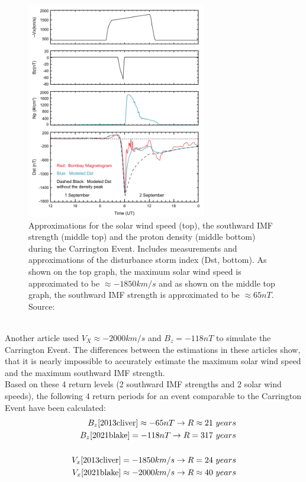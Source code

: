 \documentclass[12pt]{article}
\begin{document}
        \begin{figure}[t!]
            \centering
            \includegraphics[width=0.7\textwidth]{fig_discussion/carrington.png}
            \caption{Approximations for the solar wind speed (top), the southward IMF strength (middle top) and the proton density (middle bottom) during the Carrington Event. Includes measurements and approximations of the disturbance storm index (Dst, bottom). As shown on the top graph, the maximum solar wind speed is approximated to be $\approx -1850 km/s$ and as shown on the middle top graph, the southward IMF strength is approximated to be $\approx 65nT$. Source: \cite{2006xinlin}}
            \label{fig:returncarrington}
        \end{figure}\\
        Another article\cite{2021blake} used $V_X\approx -2000km/s$ and $B_z=-118nT$ to simulate the Carrington Event. The differences between the estimations in these articles show, that it is nearly impossible to accurately estimate the maximum solar wind speed and the maximum southward IMF strength.\\
        Based on these 4 return levels (2 southward IMF strengths and 2 solar wind speeds), the following 4 return periods for an event comparable to the Carrington Event have been calculated:
        \begin{equation}
            \begin{split}
                B_z\cite{2013cliver}\approx -65nT\rightarrow R\approx 21\ years\\
                B_z\cite{2021blake}=-118nT\rightarrow R=317\ years\\ \\
                V_x\cite{2013cliver}=-1850km/s\rightarrow R=24\ years\\
                V_x\cite{2021blake}\approx -2000km/s\rightarrow R\approx 40\ years
            \end{split}
        \end{equation}
\end{document}
